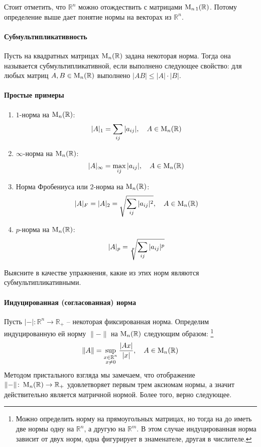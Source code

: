 Стоит отметить, что $\mathbb R^n$ можно отождествить с матрицами $\operatorname{M}_{n\,1}(\mathbb R)$.
Потому определение выше дает понятие нормы на векторах из $\mathbb R^n$.

\paragraph{Субмультипликативность}

Пусть на квадратных матрицах $\operatorname{M}_{n}(\mathbb R)$ задана некоторая норма.
Тогда она называется субмультипликативной, если выполнено следующее свойство: для любых матриц $A, B\in\operatorname{M}_{n}(\mathbb R)$ выполнено $|AB|\leqslant |A|\cdot |B|$.

\paragraph{Простые примеры}

\begin{enumerate}
\item $1$-норма на $\operatorname{M}_{n}(\mathbb R)$:
\[
|A|_1 = \sum_{ij}|a_{ij}|,\quad A\in\operatorname{M}_{n}(\mathbb R)
\]

\item $\infty$-норма на $\operatorname{M}_{n}(\mathbb R)$:
\[
|A|_\infty = \max_{ij}|a_{ij}|,\quad A\in\operatorname{M}_{n}(\mathbb R)
\]

\item Норма Фробениуса или $2$-норма на $\operatorname{M}_{n}(\mathbb R)$:
\[
|A|_F = |A|_2 = \sqrt{\sum_{ij}|a_{ij}|^2},\quad A\in\operatorname{M}_{n}(\mathbb R)
\]

\item $p$-норма на $\operatorname{M}_{n}(\mathbb R)$:
\[
|A|_p = \sqrt[p\vphantom{\int}]{\sum_{ij}|a_{ij}|^p}
\]
\end{enumerate}

Выясните в качестве упражнения, какие из этих норм являются субмультипликативными.

\paragraph{Индуцированная (согласованная) норма}

Пусть $|{-}|\colon \mathbb R^n \to \mathbb R_+$ -- некоторая фиксированная норма.
Определим индуцированную ей норму $\|{-}\|$ на $\operatorname{M}_{n}(\mathbb R)$ следующим образом:%
\footnote{Можно определить норму на прямоугольных матрицах, но тогда на до иметь две нормы одну на $\mathbb R^n$, а другую на $\mathbb R^m$.
В этом случае индуцированная норма зависит от двух норм, одна фигурирует в знаменателе, другая в числителе.}
\[
\|A\| = \sup_{\substack{x\in\mathbb R^n\\x\neq 0}}\frac{|Ax|}{|x|},\quad A\in\operatorname{M}_{n}(\mathbb R)
\]
Методом пристального взгляда мы замечаем, что отображение $\|{-}\|\colon \operatorname{M}_{n}(\mathbb R)\to \mathbb R_+$ удовлетворяет первым трем аксиомам нормы, а значит действительно является матричной нормой.
Более того, верно следующее.

